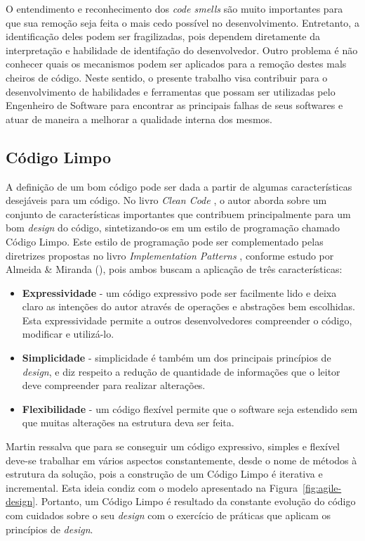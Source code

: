 O entendimento e reconhecimento dos \emph{code smells} são muito importantes para que sua remoção seja feita o mais cedo possível no desenvolvimento. Entretanto, a identificação deles podem ser fragilizadas, pois dependem diretamente da interpretação e habilidade de identifação do desenvolvedor. Outro problema é não conhecer quais os mecanismos podem ser aplicados para a remoção destes mals cheiros de código. Neste sentido, o presente trabalho visa contribuir para o desenvolvimento de habilidades e ferramentas que possam ser utilizadas pelo Engenheiro de Software para encontrar as principais falhas de seus softwares e atuar de maneira a melhorar a qualidade interna dos mesmos.

\subsection{Código Limpo}
\label{sec-clean-code}

A definição de um bom código pode ser dada a partir de algumas características desejáveis para um código. No livro \emph{Clean Code} \cite{martin2008}, o autor aborda sobre um conjunto de características importantes que contribuem principalmente para um bom \emph{design} do código, sintetizando-os em um estilo de programação chamado Código Limpo. Este estilo de programação pode ser complementado pelas diretrizes propostas no livro \emph{Implementation Patterns} \cite{beck2007}, conforme estudo por Almeida & Miranda (\citeyear{almeida2010}), pois ambos buscam a aplicação de três características:

%

\begin{itemize}
\item \textbf{Expressividade} - um código expressivo pode ser facilmente lido e deixa claro as intenções do autor através de operações e abstrações bem escolhidas. Esta expressividade permite a outros desenvolvedores compreender o código, modificar e utilizá-lo.
\item \textbf{Simplicidade} - simplicidade é também um dos principais princípios de \emph{design}, e diz respeito a redução de quantidade de informações que o leitor deve compreender para realizar alterações.
\item \textbf{Flexibilidade} - um código flexível permite que o software seja estendido sem que muitas alterações na estrutura deva ser feita.
\end{itemize}

%

Martin ressalva que para se conseguir um código expressivo, simples e flexível deve-se trabalhar em vários aspectos constantemente, desde o nome de métodos à estrutura da solução, pois a construção de um Código Limpo é iterativa e incremental. Esta ideia condiz com o modelo apresentado na Figura~\ref{fig:agile-design}. Portanto, um Código Limpo é resultado da constante evolução do código com cuidados sobre o seu \emph{design} com o exercício de práticas que aplicam os princípios de \emph{design}. 


